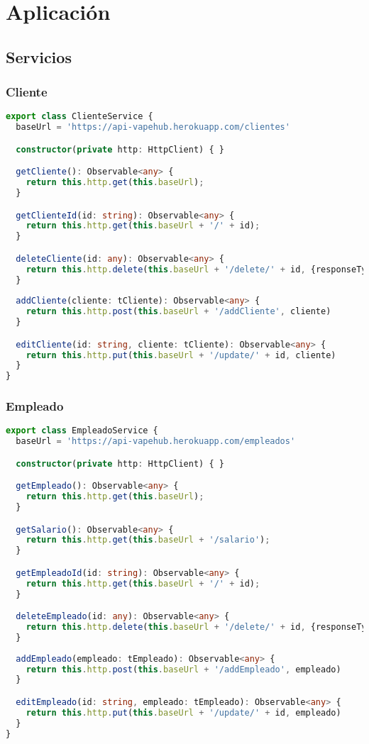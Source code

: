 \documentclass[a4paper]{article} %
\begin{document}
\section{Aplicación}
\subsection{Servicios}
\subsubsection{Cliente}
\begin{lstlisting}[language=Typescript]
	export class ClienteService {
  baseUrl = 'https://api-vapehub.herokuapp.com/clientes'

  constructor(private http: HttpClient) { }

  getCliente(): Observable<any> {
    return this.http.get(this.baseUrl);
  }

  getClienteId(id: string): Observable<any> {
    return this.http.get(this.baseUrl + '/' + id);
  }

  deleteCliente(id: any): Observable<any> {
    return this.http.delete(this.baseUrl + '/delete/' + id, {responseType: 'text'})
  }
  
  addCliente(cliente: tCliente): Observable<any> {
    return this.http.post(this.baseUrl + '/addCliente', cliente)
  }

  editCliente(id: string, cliente: tCliente): Observable<any> {
    return this.http.put(this.baseUrl + '/update/' + id, cliente)
  }
}
\end{lstlisting}
\subsubsection{Empleado}
\begin{lstlisting}[language=Typescript]
	export class EmpleadoService {
  baseUrl = 'https://api-vapehub.herokuapp.com/empleados'

  constructor(private http: HttpClient) { }

  getEmpleado(): Observable<any> {
    return this.http.get(this.baseUrl);
  }

  getSalario(): Observable<any> {
    return this.http.get(this.baseUrl + '/salario');
  }

  getEmpleadoId(id: string): Observable<any> {
    return this.http.get(this.baseUrl + '/' + id);
  }

  deleteEmpleado(id: any): Observable<any> {
    return this.http.delete(this.baseUrl + '/delete/' + id, {responseType: 'text'})
  }
  
  addEmpleado(empleado: tEmpleado): Observable<any> {
    return this.http.post(this.baseUrl + '/addEmpleado', empleado)
  }

  editEmpleado(id: string, empleado: tEmpleado): Observable<any> {
    return this.http.put(this.baseUrl + '/update/' + id, empleado)
  }
}
\end{lstlisting}\clearpage
\end{document}
